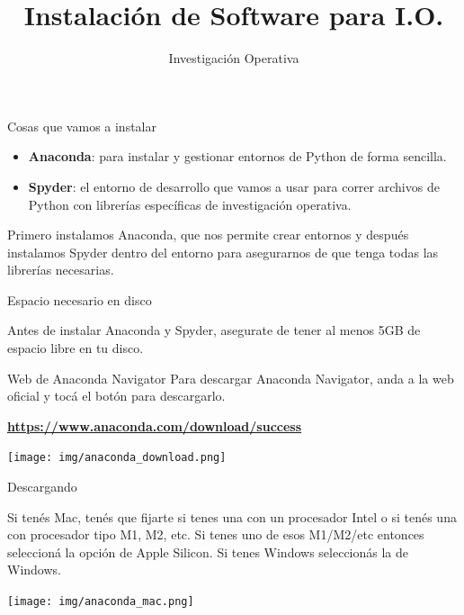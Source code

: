 \documentclass{beamer}
\title{\Huge\textbf{Instalación de Software para I.O.}}
\author{Investigación Operativa}
\date{}
\begin{document}
\begin{frame}
    \titlepage
\end{frame}

\begin{frame}{Cosas que vamos a instalar}
    \begin{itemize}
        \item \textbf{Anaconda}: para instalar y gestionar entornos de Python de forma sencilla.
        \item \textbf{Spyder}: el entorno de desarrollo que vamos a usar para correr archivos de Python con librerías específicas de investigación operativa.
    \end{itemize}
    Primero instalamos Anaconda, que nos permite crear entornos y después instalamos Spyder dentro del entorno para asegurarnos de que tenga todas las librerías necesarias.
\end{frame}

\begin{frame}{Espacio necesario en disco}
    \begin{center}
        {\LARGE Antes de instalar Anaconda y Spyder, asegurate de tener al menos 5GB de espacio libre en tu disco.}
    \end{center}
\end{frame}

\begin{frame}{Web de Anaconda Navigator}
    Para descargar Anaconda Navigator, anda a la web oficial y tocá el botón para descargarlo.

    \vspace{0.3cm}
    \href{https://www.anaconda.com/download/success}{\textcolor{secondary}{\textbf{https://www.anaconda.com/download/success}}}
    
    \vspace{0.5cm}
    \centering
    \texttt{[image: img/anaconda\_download.png]}
\end{frame}

\begin{frame}{Descargando}
    \begin{center}
        Si tenés Mac, tenés que fijarte si tenes una con un procesador Intel o si tenés una con procesador tipo M1, M2, etc. Si tenes uno de esos M1/M2/etc entonces seleccioná la opción de Apple Silicon. Si tenes Windows seleccionás la de Windows.
        
        \vspace{0.5cm}
        \texttt{[image: img/anaconda\_mac.png]}
    \end{center}
\end{frame}
\end{document}
